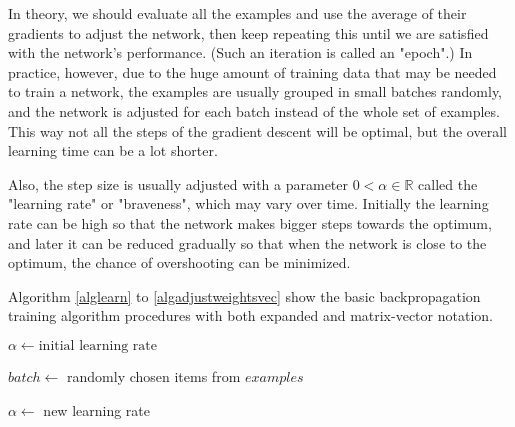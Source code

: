 \documentclass[titlepage]{article}
\begin{document}
      In theory, we should evaluate all the examples and use the average of
      their gradients to adjust the network, then keep repeating this until we
      are satisfied with the network's performance. (Such an iteration is
      called an "epoch".) In practice, however, due to the huge amount of
      training data that may be needed to train a network, the examples are
      usually grouped in small batches randomly, and the network is adjusted
      for each batch instead of the whole set of examples. This way not all the
      steps of the gradient descent will be optimal, but the overall learning
      time can be a lot shorter.

      Also, the step size is usually adjusted with a parameter
      $0 < \alpha \in \mathbb{R}$ called the "learning rate" or "braveness",
      which may vary over time. Initially the learning rate can be high so that
      the network makes bigger steps towards the optimum, and later it can be
      reduced gradually so that when the network is close to the optimum, the
      chance of overshooting can be minimized.

      Algorithm \ref{alglearn} to \ref{algadjustweightsvec} show the basic
      backpropagation training algorithm procedures with both expanded and
      matrix-vector notation.

      \begin{algorithm}
        \caption{%
          Train the network with the given set of examples. An example is an
          $(\mathbf{x}, \mathbf{y})$ pair where
          $\mathbf{x} \in \mathbb{R}^{n_0}$ is an example input, and
          $\mathbf{y} \in \mathbb{R}^{n_L}$ is the desired output for
          $\mathbf{x}$.
        } \label{alglearn}
        \begin{algorithmic}
            \State $\alpha \gets \text{initial learning rate}$
            \State {}

            \Repeat
              \State $batch \gets$ randomly chosen items from $examples$
              \State {}

                \State {}
                \State {}
              \EndFor

              \State {}

              \State $\alpha \gets$ new learning rate
          \EndProcedure
        \end{algorithmic}
      \end{algorithm}
\end{document}
